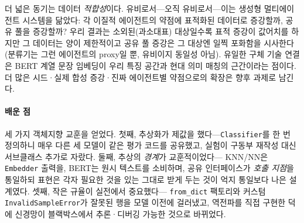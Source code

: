 \documentclass[conference]{IEEEtran}
\begin{document}
더 넓은 동기는 데이터 \emph{적합성}이다. 유비로서---오직 유비로서---이는 생성형
멀티에이전트 시스템을 닮았다: 각 이질적 에이전트의 약점에 표적화된 데이터로
증강할까, 공유 풀을 증강할까? 우리 결과는 소외된(과소대표) 대상일수록 표적
증강이 값어치를 하지만 그 데이터는 양이 제한적이고 공유 풀 증강은 그 대상엔 일찍
포화함을 시사한다(분류기는 그런 에이전트의 proxy일 뿐, 유비이지 동일성 아님).
유일한 구체 기술 연결은 BERT 계열 문장 임베딩이 우리 특징 공간과 현대 의미
매칭의 근간이라는 점이다. 더 많은 시드·실제 합성 증강·진짜 에이전트별 약점으로의
확장은 향후 과제로 남긴다.

\paragraph*{배운 점}
세 가지 객체지향 교훈을 얻었다. 첫째, 추상화가 제값을 했다---\texttt{Classifier}를
한 번 정의하니 매우 다른 세 모델이 같은 평가 코드를 공유했고, 실험이 구동부
재작성 대신 서브클래스 추가로 자랐다. 둘째, 추상의 \emph{경계}가 교훈적이었다---
KNN/NN은 \texttt{Embedder} 출력을, BERT는 원시 텍스트를 소비하며, 공유 인터페이스가
\emph{호출 지점}을 통일하되 표현은 각자 필요한 것을 있는 그대로 받게 두는 것이
억지 통일보다 나은 설계였다. 셋째, 작은 규율이 실전에서 중요했다---
\texttt{from\_dict} 팩토리와 커스텀 \texttt{InvalidSampleError}가 잘못된 행을 모델
이전에 걸러냈고, 역전파를 직접 구현한 덕에 신경망이 블랙박스에서 추론·디버깅
가능한 것으로 바뀌었다.



\end{document}

